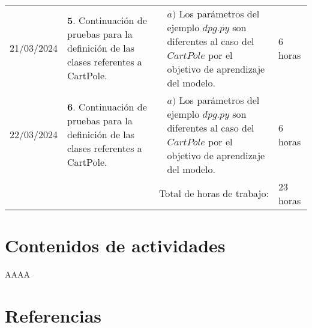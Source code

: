 \documentclass[12pt]{article}
\begin{document}
\hfill\\
\begin{minipage}[h]{\textwidth}
	\centering
	\begin{tabularx}{\textwidth}{|p{2cm}|X|X|p{2cm}|} 
		\hline		
		
	 	21/03/2024 & 
	 	$\mathbf{5}.$ Continuación de pruebas para la definición de las clases referentes a CartPole. &
	 	$a)$ Los parámetros del ejemplo $dpg.py$ son diferentes al caso del $CartPole$ por el objetivo de aprendizaje del modelo. \newline & 
	 	6 horas \\
	 	22/03/2024 & 
	 	$\mathbf{6}.$ Continuación de pruebas para la definición de las clases referentes a CartPole. &
	 	$a)$ Los parámetros del ejemplo $dpg.py$ son diferentes al caso del $CartPole$ por el objetivo de aprendizaje del modelo. \newline & 
	 	6 horas \\
	 	
	 	\hline
		\multicolumn{3}{|r|}{Total de horas de trabajo:} & 23 horas \\ 
	 	\hline                 
	\end{tabularx}
\end{minipage}




\section*{Contenidos de actividades}

AAAA \cite{Airdaldi2023}

\newpage

\section*{Referencias}
\renewcommand\refname{}


\end{document}
